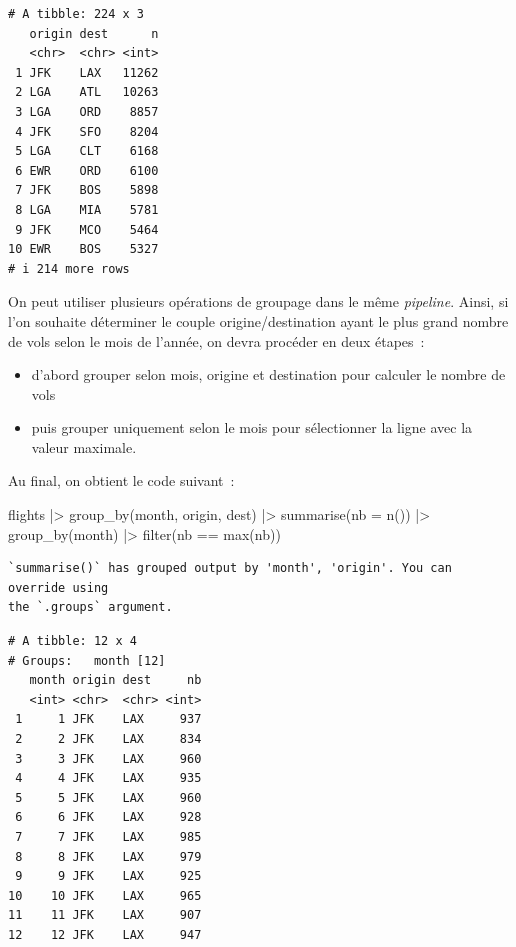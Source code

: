 \documentclass[
  letterpaper,
  DIV=11,
  numbers=noendperiod,
  oneside]{scrreprt}
\newenvironment{Shaded}{\begin{snugshade}}{\end{snugshade}}
\newcommand{\AttributeTok}[1]{\textcolor[rgb]{0.40,0.45,0.13}{#1}}
\newcommand{\FunctionTok}[1]{\textcolor[rgb]{0.28,0.35,0.67}{#1}}
\newcommand{\NormalTok}[1]{\textcolor[rgb]{0.00,0.23,0.31}{#1}}
\newcommand{\SpecialCharTok}[1]{\textcolor[rgb]{0.37,0.37,0.37}{#1}}
\providecommand{\tightlist}{%
  \setlength{\itemsep}{0pt}\setlength{\parskip}{0pt}}\usepackage{longtable,booktabs,array}
\begin{document}
\begin{verbatim}
# A tibble: 224 x 3
   origin dest      n
   <chr>  <chr> <int>
 1 JFK    LAX   11262
 2 LGA    ATL   10263
 3 LGA    ORD    8857
 4 JFK    SFO    8204
 5 LGA    CLT    6168
 6 EWR    ORD    6100
 7 JFK    BOS    5898
 8 LGA    MIA    5781
 9 JFK    MCO    5464
10 EWR    BOS    5327
# i 214 more rows
\end{verbatim}

On peut utiliser plusieurs opérations de groupage dans le même
\emph{pipeline}. Ainsi, si l'on souhaite déterminer le couple
origine/destination ayant le plus grand nombre de vols selon le mois de
l'année, on devra procéder en deux étapes~:

\begin{itemize}
\tightlist
\item
  d'abord grouper selon mois, origine et destination pour calculer le
  nombre de vols
\item
  puis grouper uniquement selon le mois pour sélectionner la ligne avec
  la valeur maximale.
\end{itemize}

Au final, on obtient le code suivant~:

\begin{Shaded}
\begin{Highlighting}[]
\NormalTok{flights }\SpecialCharTok{|\textgreater{}}
  \FunctionTok{group\_by}\NormalTok{(month, origin, dest) }\SpecialCharTok{|\textgreater{}}
  \FunctionTok{summarise}\NormalTok{(}\AttributeTok{nb =} \FunctionTok{n}\NormalTok{()) }\SpecialCharTok{|\textgreater{}}
  \FunctionTok{group\_by}\NormalTok{(month) }\SpecialCharTok{|\textgreater{}}
  \FunctionTok{filter}\NormalTok{(nb }\SpecialCharTok{==} \FunctionTok{max}\NormalTok{(nb))}
\end{Highlighting}
\end{Shaded}

\begin{verbatim}
`summarise()` has grouped output by 'month', 'origin'. You can override using
the `.groups` argument.
\end{verbatim}

\begin{verbatim}
# A tibble: 12 x 4
# Groups:   month [12]
   month origin dest     nb
   <int> <chr>  <chr> <int>
 1     1 JFK    LAX     937
 2     2 JFK    LAX     834
 3     3 JFK    LAX     960
 4     4 JFK    LAX     935
 5     5 JFK    LAX     960
 6     6 JFK    LAX     928
 7     7 JFK    LAX     985
 8     8 JFK    LAX     979
 9     9 JFK    LAX     925
10    10 JFK    LAX     965
11    11 JFK    LAX     907
12    12 JFK    LAX     947
\end{verbatim}
\end{document}
